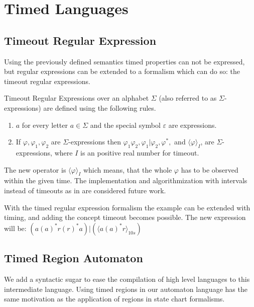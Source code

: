			
	\section{Timed Languages}	
		\subsection{Timeout Regular Expression}
	
		Using the previously defined semantics timed properties can not be expressed,
		but regular expressions can be extended to a formalism which can do so: 
		the timeout regular expressions.
		\begin{dfn}
			\label{dfn:cep:tre}
			Timeout Regular Expressions over an alphabet $\Sigma$ (also referred to as $\Sigma$-expressions)
			are defined using the following rules.
			\begin{enumerate}
				\item $a$ for every letter $a \in \Sigma$ and the special symbol $\varepsilon$ are expressions.
				\item If $\varphi, \varphi_1, \varphi_2$ are $\Sigma$-expressions then %
					$ %
					\varphi_1 \varphi_2,
					\varphi_1 | \varphi_2,
					\varphi^\ast,$ and 
					$\langle \varphi \rangle_I$, 
					are $\Sigma$-expressions, where $I$ is an positive real number for timeout. %
			\end{enumerate}
		\end{dfn}

		The new operator is $\langle \varphi \rangle_I$ which means, that the whole $\varphi$ has to be observed within the given time.	
		The implementation and algorithmization with intervals instead of timeouts as in \citep{tre} are considered future work.

		With the timed regular expression formalism the example can be extended with timing, and adding the concept timeout becomes possible.
		The new expression will be: $(a (a)^\ast r(r)^\ast a)|( \langle a(a)^\ast r \rangle_{10 s})$
		
		\subsection{Timed Region Automaton}
		
		We add a syntactic sugar to ease the compilation of high level languages to this intermediate language.
		Using timed regions in our automaton language has the same motivation as the application of regions in state chart formalisms.
		

